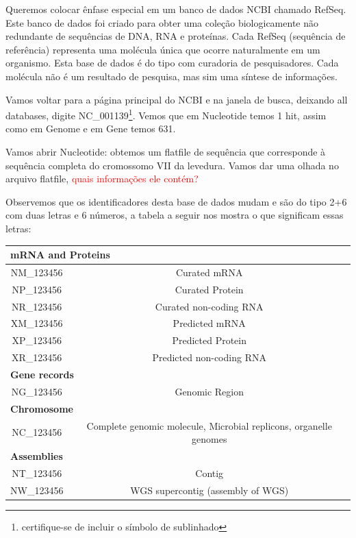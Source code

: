 \documentclass[letter,11pt]{book}
\begin{document}
Queremos colocar ênfase especial em um banco de dados NCBI chamado RefSeq. Este banco de dados foi criado para obter uma coleção biologicamente não redundante de sequências de DNA, RNA e proteínas. Cada RefSeq (sequência de referência) representa uma molécula única que ocorre naturalmente em um organismo. Esta base de dados é do tipo com curadoria de pesquisadores. Cada molécula não é um resultado de pesquisa, mas sim uma síntese de informações.

Vamos voltar para a página principal do NCBI e na janela de busca, deixando all databases, digite NC\_001139\footnote{certifique-se de incluir o símbolo de sublinhado}. Vemos que em Nucleotide temos 1 hit, assim como em Genome e em Gene temos 631.

Vamos abrir Nucleotide: obtemos um flatfile de sequência  que corresponde à sequência completa do cromossomo VII da levedura. Vamos dar uma olhada no arquivo flatfile, \textcolor{red}{quais informações ele contém?} 

Observemos que os identificadores desta base de dados mudam e são do tipo 2+6 com duas letras e 6 números, a tabela a seguir nos mostra o que significam essas letras: 

\begin{tabular}{|c|c|}
\hline  \multicolumn{2}{|l|}{\textbf{mRNA and Proteins}} \\
\hline  NM\_123456 & Curated mRNA  \\ 
\hline  NP\_123456 &  Curated Protein\\ 
\hline  NR\_123456 &  Curated non-coding RNA\\ 
\hline  XM\_123456 &  Predicted mRNA\\ 
\hline  XP\_123456 &  Predicted Protein\\ 
\hline  XR\_123456 &  Predicted non-coding RNA\\ 
\hline   \multicolumn{2}{|l|}{\textbf{Gene records}} \\
\hline  NG\_123456 & Genomic Region \\ 
\hline  \multicolumn{2}{|l|}{\textbf{Chromosome}} \\ 
\hline  NC\_123456 & Complete genomic molecule, Microbial replicons, organelle genomes  \\ 
\hline  \multicolumn{2}{|l|}{\textbf{Assemblies}} \\ 
\hline  NT\_123456 & Contig \\ 
\hline  NW\_123456 & WGS supercontig (assembly of WGS) \\ 
\hline 
\end{tabular} 
\end{document}
